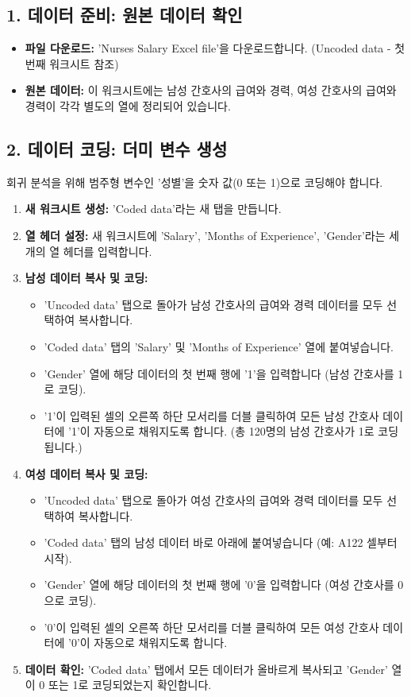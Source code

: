 \documentclass[11pt,a4paper]{article}
\begin{document}
\subsection*{1. 데이터 준비: 원본 데이터 확인}
\begin{itemize}
    \item \textbf{파일 다운로드:} 'Nurses Salary Excel file'을 다운로드합니다. (Uncoded data - 첫 번째 워크시트 참조)
    \item \textbf{원본 데이터:} 이 워크시트에는 남성 간호사의 급여와 경력, 여성 간호사의 급여와 경력이 각각 별도의 열에 정리되어 있습니다.
\end{itemize}

\subsection*{2. 데이터 코딩: 더미 변수 생성}
회귀 분석을 위해 범주형 변수인 '성별'을 숫자 값(0 또는 1)으로 코딩해야 합니다.

\begin{enumerate}
    \item \textbf{새 워크시트 생성:} 'Coded data'라는 새 탭을 만듭니다.
    \item \textbf{열 헤더 설정:} 새 워크시트에 'Salary', 'Months of Experience', 'Gender'라는 세 개의 열 헤더를 입력합니다.
    \item \textbf{남성 데이터 복사 및 코딩:}
    \begin{itemize}
        \item 'Uncoded data' 탭으로 돌아가 남성 간호사의 급여와 경력 데이터를 모두 선택하여 복사합니다.
        \item 'Coded data' 탭의 'Salary' 및 'Months of Experience' 열에 붙여넣습니다.
        \item 'Gender' 열에 해당 데이터의 첫 번째 행에 '1'을 입력합니다 (남성 간호사를 1로 코딩).
        \item '1'이 입력된 셀의 오른쪽 하단 모서리를 더블 클릭하여 모든 남성 간호사 데이터에 '1'이 자동으로 채워지도록 합니다. (총 120명의 남성 간호사가 1로 코딩됩니다.)
    \end{itemize}
    \item \textbf{여성 데이터 복사 및 코딩:}
    \begin{itemize}
        \item 'Uncoded data' 탭으로 돌아가 여성 간호사의 급여와 경력 데이터를 모두 선택하여 복사합니다.
        \item 'Coded data' 탭의 남성 데이터 바로 아래에 붙여넣습니다 (예: A122 셀부터 시작).
        \item 'Gender' 열에 해당 데이터의 첫 번째 행에 '0'을 입력합니다 (여성 간호사를 0으로 코딩).
        \item '0'이 입력된 셀의 오른쪽 하단 모서리를 더블 클릭하여 모든 여성 간호사 데이터에 '0'이 자동으로 채워지도록 합니다.
    \end{itemize}
    \item \textbf{데이터 확인:} 'Coded data' 탭에서 모든 데이터가 올바르게 복사되고 'Gender' 열이 0 또는 1로 코딩되었는지 확인합니다.
\end{enumerate}
\end{document}
